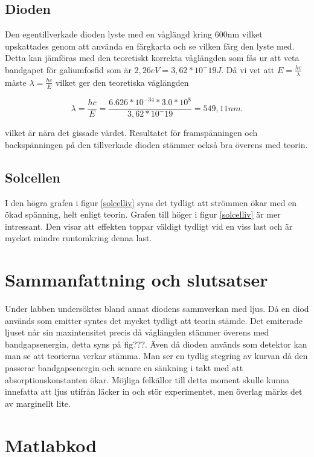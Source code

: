 \documentclass[a4paper]{article}
\begin{document}
\subsection{Dioden}
Den egentillverkade dioden lyste med en våglängd kring 600nm vilket upskattades genom att använda en färgkarta och se vilken färg den lyste med. Detta kan jämföras med den teoretiskt korrekta våglängden som fås ur att veta bandgapet för galiumfosfid som är $2,26eV = 3,62*10^-19J$. Då vi vet att $E = \frac{hc}{\lambda}$ måste $\lambda = \frac{hc}{E}$ vilket ger den teoretiska våglängden

\begin{equation}
	\lambda = \frac{hc}{E} = \frac{6.626*10^{-34} * 3.0*10^8}{3,62*10^-19} = 549,11 nm.
\end{equation}

vilket är nära det gissade värdet. Resultatet för framspänningen och backspänningen på den tillverkade dioden stämmer också bra överens med teorin.

\subsection{Solcellen}
I den högra grafen i figur \ref{solcelliv} syns det tydligt att strömmen ökar med en ökad spänning, helt enligt teorin. Grafen till höger i figur \ref{solcelliv} är mer intressant. Den visar att effekten toppar väldigt tydligt vid en viss last och är mycket mindre runtomkring denna last. 


\section{Sammanfattning och slutsatser}
Under labben undersöktes bland annat diodens sammverkan med ljus. Då en diod används som emitter syntes det mycket tydligt att teorin stämde. Det emiterade ljuset når sin maxintensitet precis då våglängden stämmer överens med bandgapsenergin, detta syns på fig???. Även då dioden används som detektor kan man se att teorierna verkar stämma. Man ser en tydlig stegring av kurvan då den passerar bandgapsenergin och senare en sänkning i takt med att absorptionskonstanten ökar. Möjliga felkällor till detta moment skulle kunna innefatta att ljus utifrån läcker in och stör experimentet, men överlag märks det av marginellt lite. 

\newpage
\appendix
\section{Matlabkod}
\end{document}
